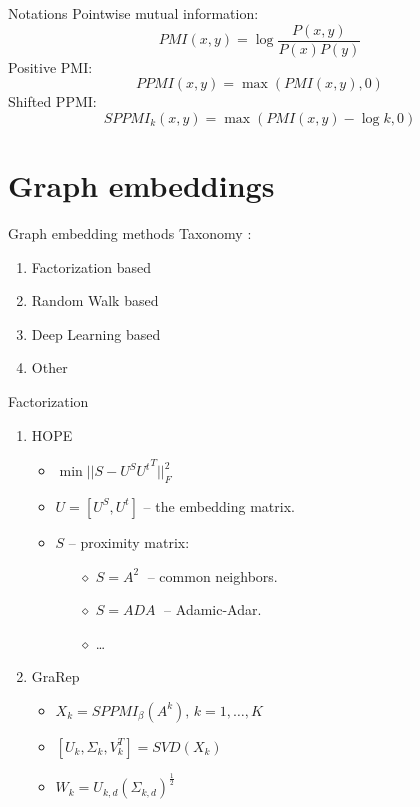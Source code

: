 \documentclass[10pt,aspectratio=169]{beamer}
\begin{document}
\begin{frame}[fragile]{Notations}
  Pointwise mutual information: $$PMI(x,y)=\log \frac{P(x,y)}{P(x)P(y)}$$
  Positive PMI: $$PPMI(x,y)=\max (PMI(x,y),0)$$
  Shifted PPMI: $$SPPMI_k(x,y)=\max (PMI(x,y)-\log k,0)$$
\end{frame}


\section{Graph embeddings}

\begin{frame}[fragile]{Graph embedding methods}
  Taxonomy \cite{goyal2017graph}:
  \begin{enumerate}
    \item Factorization based
    \item Random Walk based
    \item Deep Learning based
    \item Other
  \end{enumerate}
\end{frame}

\begin{frame}[fragile]{Factorization}
  \begin{enumerate}
    \item HOPE \cite{ou2016asymmetric}
    \begin{itemize}
      \item $\displaystyle \min ||S-U^S{U^t}^T||_F^2$\\[1mm]
      \item $\displaystyle U=[U^S,U^t]$ -- the embedding matrix.\\[1mm]
      \item $S$ -- proximity matrix:
      \begin{itemize}
        \item[$\diamond$] $S=A^2 \;$ -- common neighbors.
        \item[$\diamond$] $S=ADA \;$ -- Adamic-Adar.
        \item[$\diamond$] \ldots
      \end{itemize}
    \end{itemize}

    \item GraRep \cite{Cao:2015:GLG:2806416.2806512}
    \begin{itemize}
      \item $X_k=SPPMI_{\beta}(A^k), \, k=1,\ldots,K$\\[1mm]
      \item $[U_k,\Sigma_k,V_k^T]=SVD(X_k)$\\[1mm]
      \item $W_k=U_{k,d}(\Sigma_{k,d})^{\frac{1}{2}}$
    \end{itemize}
  \end{enumerate}
\end{frame}
\end{document}
